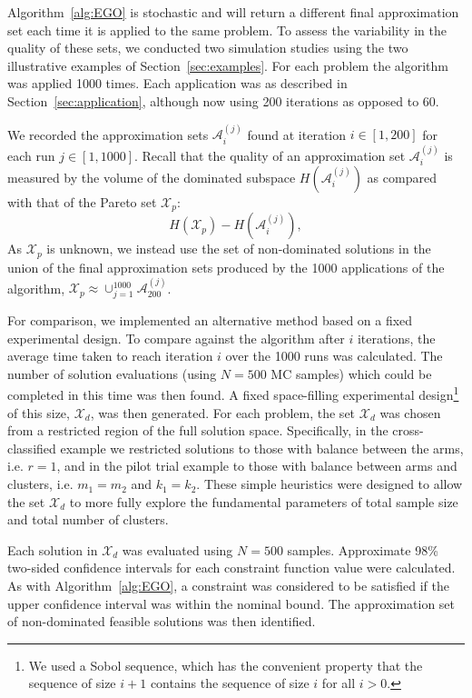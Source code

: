 \documentclass{article} %
\begin{document}
Algorithm~\ref{alg:EGO} is stochastic and will return a different final approximation set each time it is applied to the same problem. To assess the variability in the quality of these sets, we conducted two simulation studies using the two illustrative examples of Section~\ref{sec:examples}. For each problem the algorithm was applied 1000 times. Each application was as described in Section~\ref{sec:application}, although now using 200 iterations as opposed to 60. 

We recorded the approximation sets $\mathcal{A}_{i}^{(j)}$ found at iteration $i \in [1,200]$ for each run $j \in [1,1000]$. Recall that the quality of an approximation set $\mathcal{A}_{i}^{(j)}$ is measured by the volume of the dominated subspace $H(\mathcal{A}_{i}^{(j)})$ as compared with that of the Pareto set $\mathcal{X}_{p}$:
\begin{equation}
H(\mathcal{X}_{p}) - H(\mathcal{A}_{i}^{(j)}),
\end{equation}
As $\mathcal{X}_{p}$ is unknown, we instead use the set of non-dominated solutions in the union of the final approximation sets produced by the 1000 applications of the algorithm, $\mathcal{X}_{p} \approx \cup_{j=1}^{1000} \mathcal{A}_{200}^{(j)}$.

For comparison, we implemented an alternative method based on a fixed experimental design. To compare against the algorithm after $i$ iterations, the average time taken to reach iteration $i$ over the 1000 runs was calculated. The number of solution evaluations (using $N = 500$ MC samples) which could be completed in this time was then found. A fixed space-filling experimental design\footnote{We used a Sobol sequence, which has the convenient property that the sequence of size $i+1$ contains the sequence of size $i$ for all $i > 0$.}
of this size, $\mathcal{X}_{d}$, was then generated. For each problem, the set $\mathcal{X}_{d}$ was chosen from a restricted region of the full solution space. Specifically, in the cross-classified example we restricted solutions to those with balance between the arms, i.e. $r=1$, and in the pilot trial example to those with balance between arms and clusters, i.e. $m_{1} = m_{2}$ and $k_{1} = k_{2}$. These simple heuristics were designed to allow the set $\mathcal{X}_{d}$ to more fully explore the fundamental parameters of total sample size and total number of clusters.

Each solution in $\mathcal{X}_{d}$ was evaluated using $N=500$ samples. Approximate 98\% two-sided confidence intervals for each constraint function value were calculated. As with Algorithm~\ref{alg:EGO}, a constraint was considered to be satisfied if the upper confidence interval was within the nominal bound. The approximation set of non-dominated feasible solutions was then identified.
\end{document}
